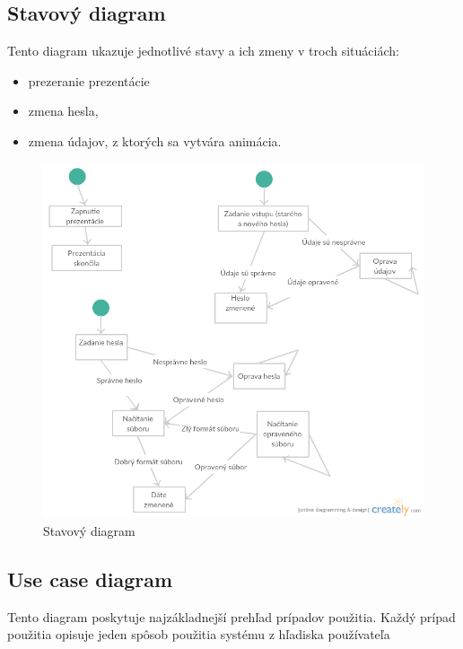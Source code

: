 \documentclass[12pt,a4paper]{report}
\begin{document}
\subsection[Stavový diagram]{\rmfamily\bfseries
	Stavový diagram}
Tento diagram ukazuje jednotlivé stavy a ich zmeny v troch situáciách:
\begin{itemize}
	\item prezeranie prezentácie
	\item zmena hesla,
	\item zmena údajov, z ktorých sa vytvára animácia.
\end{itemize}
\begin{figure}[htb]
	\centering
	\includegraphics[scale=0.5]{Stavovy_diagram}
	\caption{Stavový diagram}
	\label{fig:Stavový diagram}
\end{figure}
\FloatBarrier
\clearpage
\subsection[Use case diagram]{\rmfamily\bfseries
	Use case diagram}
	Tento diagram poskytuje najzákladnejší prehľad prípadov použitia. Každý prípad použitia opisuje jeden spôsob použitia systému z hľadiska používateľa
\end{document}
